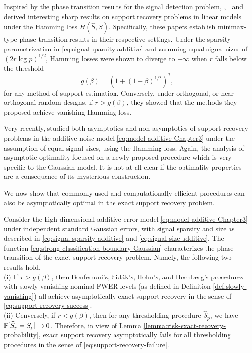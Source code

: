 Inspired by the phase transition results for the signal detection problem, \cite{ji2012ups}, \citet{genovese2012comparison}, and \cite{jin2014optimality} derived interesting sharp results on support recovery problems in linear models under the Hamming loss $H(\widehat S, S)$.
Specifically, these papers establish minimax-type phase transition results in their respective settings. 
Under the sparsity parametrization in \eqref{eq:signal-sparsity-additive} and assuming equal signal sizes of ${(2r\log{p})^{1/2}}$, Hamming losses were shown to diverge to $+\infty$ when $r$ falls below the threshold
\begin{equation} \label{eq:strong-classification-boundary-Gaussian}
    g(\beta) = (1 + (1 - \beta)^{1/2})^2,
\end{equation}
for any method of support estimation.
Conversely, under orthogonal, or near-orthogonal random designs, if $r>g(\beta)$, they showed that the methods they proposed achieve vanishing Hamming loss.

Very recently, \citet{butucea2018variable}\; studied both asymptotics and non-asymptotics of support recovery problems in the additive noise model \eqref{eq:model-additive-Chapter3} under the assumption of equal signal sizes, using the Hamming loss.
Again, the analysis of asymptotic optimality focused on a newly proposed procedure which is very specific to the Gaussian model.
It is not at all clear if the optimality properties are a consequence of its mysterious construction.

We now show that commonly used and computationally efficient procedures can also be asymptotically optimal in the exact support recovery problem.

\begin{theorem} \label{thm:Gaussian-error-exact-boundary}
Consider the high-dimensional additive error model \eqref{eq:model-additive-Chapter3} under independent standard Gaussian errors, with signal sparsity and size as described in \eqref{eq:signal-sparsity-additive} and \eqref{eq:signal-size-additive}.
The function \eqref{eq:strong-classification-boundary-Gaussian} characterizes the phase transition of the exact support recovery problem.
Namely, the following two results hold.\\

{\rm (i)} If $\underline{r} > {{g}}(\beta)$, then Bonferroni's, Sid\'ak's, Holm's, and Hochberg's procedures with slowly vanishing  nominal FWER levels 
(as defined in Definition \ref{def:slowly-vanishing}) all achieve asymptotically exact support recovery in the sense of \eqref{eq:support-recovery-success}. \\

{\rm (ii)} Conversely, if $\overline{r} < {{g}}(\beta)$, then for any thresholding procedure $\widehat{S}_p$, we have $\P[\widehat{S}_p=S_p]\to0$.
Therefore, in view of Lemma \ref{lemma:risk-exact-recovery-probability}, exact support recovery asymptotically fails for all thresholding procedures in the sense of \eqref{eq:support-recovery-failure}.
\end{theorem}

